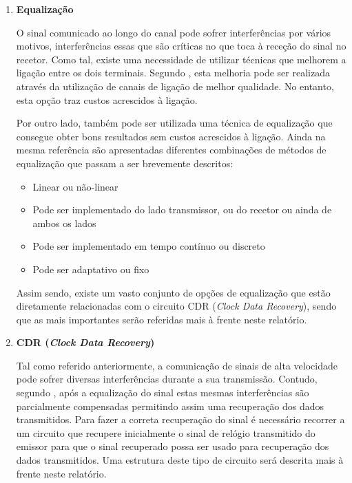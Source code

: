 \begin{enumerate}
	\item \textbf{Equalização}
	
	\hspace{1.0em}O sinal comunicado ao longo do canal pode sofrer interferências por vários motivos, interferências essas que são críticas no que toca à receção do sinal no recetor. Como tal, existe uma necessidade de utilizar técnicas que melhorem a ligação entre os dois terminais. Segundo \cite{R012}, esta melhoria pode ser realizada através da utilização de canais de ligação de melhor qualidade. No entanto, esta opção traz custos acrescidos à ligação. 
	
	\hspace{1.0em}Por outro lado, também pode ser utilizada uma técnica de equalização que consegue obter bons resultados sem custos acrescidos à ligação. Ainda na mesma referência são apresentadas diferentes combinações de métodos de equalização que passam a ser brevemente descritos:
	
	\begin{itemize}
		\item Linear ou não-linear
		\item Pode ser implementado do lado transmissor, ou do recetor ou ainda de ambos os lados
		\item Pode ser implementado em tempo contínuo ou discreto
		\item Pode ser adaptativo ou fixo
	\end{itemize}

	Assim sendo, existe um vasto conjunto de opções de equalização que estão diretamente relacionadas com o circuito CDR (\textit{Clock Data Recovery}), sendo que as mais importantes serão referidas mais à frente neste relatório. 

	\item \textbf{CDR (\textit{Clock Data Recovery})}
	
	\hspace{1.0em}Tal como referido anteriormente, a comunicação de sinais de alta velocidade pode sofrer diversas interferências durante a sua transmissão. Contudo, segundo \cite{R012}, após a equalização do sinal estas mesmas interferências são parcialmente compensadas permitindo assim uma recuperação dos dados transmitidos.  Para fazer a correta recuperação do sinal é necessário recorrer a um circuito que recupere inicialmente o sinal de relógio transmitido do emissor para que o sinal recuperado possa ser usado para recuperação dos dados transmitidos. Uma estrutura deste tipo de circuito será descrita mais à frente neste relatório.
\end{enumerate}

